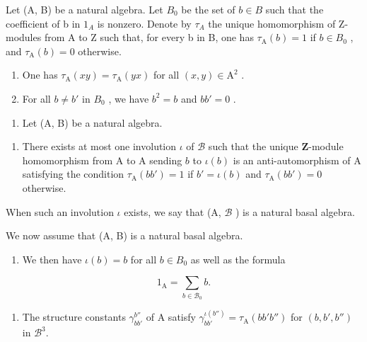 Let (A, B) be a natural algebra. Let \(B_{0}\) be the set of \(b \in B\) such that the coefficient of b in \(1_{A}\) is nonzero. Denote by \(\tau_{A}\) the unique homomorphism of Z-modules from A to Z such that, for every b in B, one has \(\tau_{\mathrm{A}}(b) = 1\) if \(b \in B_{0}\) , and \(\tau_{\mathrm{A}}(b) = 0\) otherwise.

\begin{enumerate}
\def\labelenumi{\alph{enumi})}
\item
  One has \(\tau_{\mathrm{A}}(xy) = \tau_{\mathrm{A}}(yx)\) for all \((x,y)\in \mathrm{A}^2\) .
\item
  For all \(b \neq b'\) in \(B_{0}\) , we have \(b^2 = b\) and \(bb' = 0\) .
\end{enumerate}

\begin{enumerate}
\def\labelenumi{\arabic{enumi})}
\setcounter{enumi}{6}
\tightlist
\item
  Let (A, B) be a natural algebra.
\end{enumerate}

\begin{enumerate}
\def\labelenumi{\alph{enumi})}
\tightlist
\item
  There exists at most one involution \(\iota\) of \(\mathcal{B}\) such that the unique \(\mathbf{Z}\)-module homomorphism from A to A sending \(b\) to \(\iota(b)\) is an anti-automorphism of A satisfying the condition \(\tau_{\mathrm{A}}(bb') = 1\) if \(b' = \iota(b)\) and \(\tau_{\mathrm{A}}(bb') = 0\) otherwise.
\end{enumerate}

When such an involution \(\iota\) exists, we say that (A, \(\mathcal{B}\) ) is a natural basal algebra.

We now assume that (A, B) is a natural basal algebra.

\begin{enumerate}
\def\labelenumi{\alph{enumi})}
\setcounter{enumi}{1}
\tightlist
\item
  We then have \(\iota(b) = b\) for all \(b \in B_{0}\) as well as the formula
\end{enumerate}

\[
1 _ {\mathrm{A}} = \sum_ {b \in \mathcal {B} _ {0}} b.
\]

\begin{enumerate}
\def\labelenumi{\alph{enumi})}
\setcounter{enumi}{2}
\tightlist
\item
  The structure constants \(\gamma_{bb'}^{b''}\) of A satisfy \(\gamma_{bb'}^{\iota(b'')} = \tau_{\mathrm{A}}(bb'b'')\) for \((b, b', b'')\) in \(\mathcal{B}^{3}\).
\end{enumerate}

